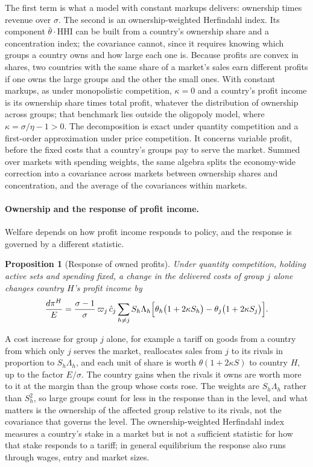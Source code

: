 \documentclass[11pt]{article}
\newtheorem{proposition}{Proposition}
\theoremstyle{definition}
\theoremstyle{remark}
\begin{document}
\noindent The first term is what a model with constant markups delivers: ownership
times revenue over $\sigma$. The second is an ownership-weighted Herfindahl index. Its
component $\bar\theta\cdot\mathrm{HHI}$ can be built from a country's ownership share and
a concentration index; the covariance cannot, since it requires knowing which groups a
country owns and how large each one is. Because profits are convex in shares, two
countries with the same share of a market's sales earn different profits if one owns
the large groups and the other the small ones. With constant markups, as under
monopolistic competition, $\kappa=0$ and a country's profit income is its ownership
share times total profit, whatever the distribution of ownership across groups; that
benchmark lies outside the oligopoly model, where $\kappa=\sigma/\eta-1>0$. The
decomposition is exact under quantity competition and a first-order approximation under
price competition. It concerns variable profit, before the fixed costs that a country's
groups pay to serve the market. Summed over markets with spending weights, the same
algebra splits the economy-wide correction into a covariance across markets between
ownership shares and concentration, and the average of the covariances within markets.

\paragraph{Ownership and the response of profit income.} Welfare depends on how profit
income responds to policy, and the response is governed by a different statistic.

\begin{proposition}[Response of owned profits]\label{prop:response}
Under quantity competition, holding active sets and spending fixed, a
change in the delivered costs of group $j$ alone changes country $H$'s profit income by
\begin{equation}
  \frac{d\pi^H}{E}=\frac{\sigma-1}{\sigma}\,\varpi_j\,\hat c_j
  \sum_{h\neq j}S_h\Lambda_h\Bigl[\theta_h\bigl(1+2\kappa S_h\bigr)
  -\theta_j\bigl(1+2\kappa S_j\bigr)\Bigr].
  \label{eq:response}
\end{equation}
\end{proposition}

\noindent A cost increase for group $j$ alone, for example a tariff on goods from a
country from which only $j$ serves the market, reallocates sales from $j$ to its rivals
in proportion to $S_h\Lambda_h$, and each unit of share is worth $\theta(1+2\kappa S)$ to
country $H$, up to the factor $E/\sigma$. The country gains when the rivals it owns are
worth more to it at the margin than the group whose costs rose. The weights are
$S_h\Lambda_h$ rather than $S_h^2$, so large groups count for less in the response than
in the level, and what matters is the ownership of the affected group relative to its
rivals, not the covariance that governs the level. The ownership-weighted Herfindahl
index measures a country's stake in a market but is not a sufficient statistic for how
that stake responds to a tariff; in general equilibrium the response also runs through
wages, entry and market sizes.
\end{document}
